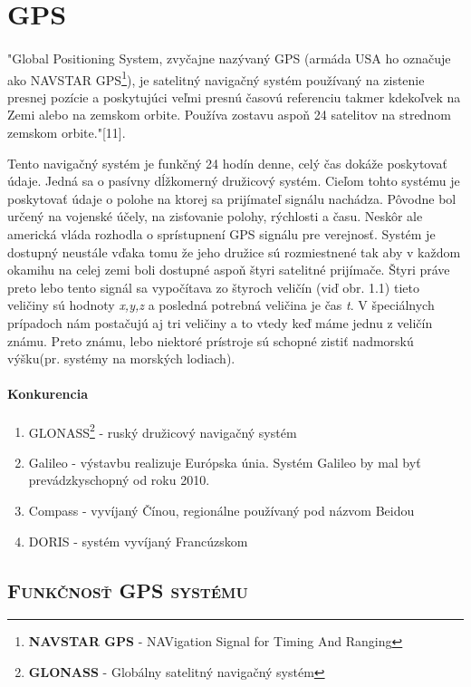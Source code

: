 \section{\textsc{GPS}}
\paragraph{}
"Global Positioning System, zvyčajne nazývaný GPS (armáda USA ho označuje ako
NAVSTAR GPS\footnote{\textbf{NAVSTAR GPS} - NAVigation Signal for Timing And Ranging}), je satelitný navigačný
systém používaný na zistenie presnej pozície a poskytujúci veľmi presnú časovú
referenciu takmer kdekoľvek na Zemi alebo na zemskom orbite. Používa zostavu
aspoň
24 satelitov na strednom zemskom orbite."[11].

Tento navigačný systém je funkčný 24 hodín denne, celý čas dokáže poskytovať údaje. Jedná sa o pasívny dĺžkomerný družicový systém. Cieľom tohto systému je poskytovať údaje o polohe na ktorej sa prijímateľ signálu nachádza. Pôvodne bol určený na vojenské účely, na zisťovanie polohy, rýchlosti a času. Neskôr ale americká vláda rozhodla o sprístupnení GPS signálu pre verejnosť. Systém je dostupný neustále vďaka tomu že jeho družice sú rozmiestnené tak aby v každom okamihu na celej zemi boli dostupné aspoň štyri satelitné prijímače. Štyri práve preto lebo tento signál sa vypočítava zo štyroch veličín (viď obr. 1.1) tieto veličiny sú hodnoty \textit{x,y,z} a posledná potrebná veličina je čas \textit{t}. V špeciálnych prípadoch nám postačujú aj tri veličiny a to vtedy keď máme jednu z veličín známu. Preto známu, lebo niektoré prístroje sú schopné zistiť nadmorskú výšku(pr. systémy na morských lodiach).

\paragraph{Konkurencia}
\begin{enumerate}
\item GLONASS\footnote{\textbf{GLONASS} - Globálny satelitný navigačný systém} - ruský družicový navigačný systém
\item Galileo - výstavbu realizuje Európska únia. Systém Galileo by mal byť prevádzkyschopný od roku 2010.
\item Compass - vyvíjaný Čínou, regionálne používaný pod názvom Beidou
\item DORIS - systém vyvíjaný Francúzskom
\end{enumerate}

\subsection{\textsc{Funkčnosť GPS systému}}
